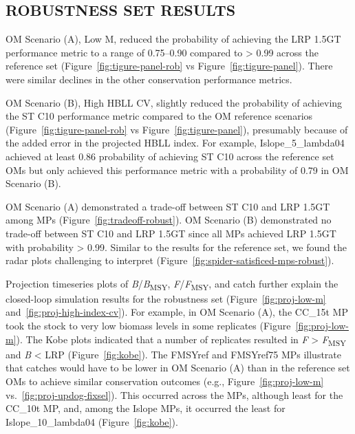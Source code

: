 \documentclass[11pt]{book}
\begin{document}
\hypertarget{robustness-set-results}{%
\subsection{ROBUSTNESS SET RESULTS}\label{robustness-set-results}}

OM Scenario (A), Low M, reduced the probability of achieving the LRP 1.5GT performance metric to a range of 0.75--0.90 compared to \textgreater{} 0.99 across the reference set (Figure~\ref{fig:tigure-panel-rob} vs Figure~\ref{fig:tigure-panel}). There were similar declines in the other conservation performance metrics.

OM Scenario (B), High HBLL CV, slightly reduced the probability of achieving the ST C10 performance metric compared to the OM reference scenarios (Figure~\ref{fig:tigure-panel-rob} vs Figure~\ref{fig:tigure-panel}), presumably because of the added error in the projected HBLL index. For example, Islope\_5\_lambda04 achieved at least 0.86 probability of achieving ST C10 across the reference set OMs but only achieved this performance metric with a probability of 0.79 in OM Scenario (B).

OM Scenario (A) demonstrated a trade-off between ST C10 and LRP 1.5GT among MPs (Figure~\ref{fig:tradeoff-robust}). OM Scenario (B) demonstrated no trade-off between ST C10 and LRP 1.5GT since all MPs achieved LRP 1.5GT with probability \textgreater{} 0.99. Similar to the results for the reference set, we found the radar plots challenging to interpret (Figure~\ref{fig:spider-satisficed-mps-robust}).

Projection timeseries plots of \emph{B}/\emph{B}\textsubscript{MSY}, \emph{F}/\emph{F}\textsubscript{MSY}, and catch further explain the closed-loop simulation results for the robustness set (Figure~\ref{fig:proj-low-m} and~\ref{fig:proj-high-index-cv}). For example, in OM Scenario (A), the CC\_15t MP took the stock to very low biomass levels in some replicates (Figure~\ref{fig:proj-low-m}). The Kobe plots indicated that a number of replicates resulted in \emph{F} \textgreater{} \emph{F}\textsubscript{MSY} and \emph{B} \textless{} LRP (Figure~\ref{fig:kobe}). The FMSYref and FMSYref75 MPs illustrate that catches would have to be lower in OM Scenario (A) than in the reference set OMs to achieve similar conservation outcomes (e.g., Figure~\ref{fig:proj-low-m} vs.~\ref{fig:proj-updog-fixsel}). This occurred across the MPs, although least for the CC\_10t MP, and, among the Islope MPs, it occurred the least for Islope\_10\_lambda04 (Figure~\ref{fig:kobe}).
\end{document}

